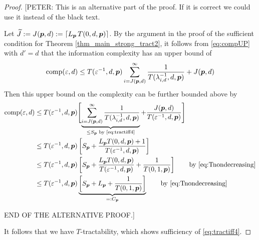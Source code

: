 \documentclass[11pt,a4paper]{article}
\newcommand{\peter}[1]{\begingroup\color{purple}#1\endgroup}
\begin{document}
\begin{proof}
\peter{
[PETER: This is an alternative part of the proof. If it is correct we could use it instead of the black text. 

\bigskip

Let $\widetilde{J}:=J(\boldsymbol{p},d): = \lceil L_{\boldsymbol{p}}\, T(0,d,\boldsymbol{p})\rceil$. By the argument in the proof of the sufficient condition for Theorem \ref{thm_main_strong_tract2}, it follows from \eqref{eq:compUP} with $d'=d$ that the information complexity has an upper bound of
\begin{equation*}
	 \operatorname{comp}(\varepsilon,d) \le  T(\varepsilon^{-1},d,\boldsymbol{p}) \sum_{i=J(\boldsymbol{p},d)}^\infty \frac{1}{T(\lambda_{i, d}^{-1},d,\boldsymbol{p})} + J(\boldsymbol{p},d)
\end{equation*}
 Then this upper bound on the complexity can be further bounded above by
\begin{align*}
       \operatorname{comp}(\varepsilon,d)
       & \le T(\varepsilon^{-1},d,\boldsymbol{p}) \Biggl [ 
       \underbrace{\sum_{i=J(\boldsymbol{p},d)}^\infty \frac{1}{T(\lambda_{i, d}^{-1},d,\boldsymbol{p})}}_{\le S_{\boldsymbol{p}} \text{ by \eqref{eq:tractiff4}}}
       + \frac{J(\boldsymbol{p},d)}{T(\varepsilon^{-1},d, \boldsymbol{p})} \Biggr ] \\
       & \le T(\varepsilon^{-1},d,\boldsymbol{p})\left[ S_{\boldsymbol{p}} + \frac{L_{\boldsymbol{p}} T(0,d,\boldsymbol{p})+1}{T(\varepsilon^{-1},d, \boldsymbol{p})}\right]\\
       & \le T(\varepsilon^{-1},d,\boldsymbol{p})\left[S_{\boldsymbol{p}} +\frac{L_{\boldsymbol{p}} T(0,d,\boldsymbol{p})}{T(\varepsilon^{-1},d, \boldsymbol{p})}
       + \frac{1}{T(0,1, \boldsymbol{p})}\right]
       \qquad \text{by \eqref{eq:Tnondecreasing}}   \\
       & \le T(\varepsilon^{-1},d,\boldsymbol{p}) 
       \underbrace{\left [  S_{\boldsymbol{p}} + L_{\boldsymbol{p}} + \frac{1}{T(0,1, \boldsymbol{p})}\right]}_{=:C_{\boldsymbol{p}}}
       \qquad \text{by \eqref{eq:Tnondecreasing}}  
\end{align*}


\bigskip

END OF THE ALTERNATIVE PROOF.]
}


It follows that we have $T$-tractability, which shows sufficiency of \eqref{eq:tractiff4}.

\bigskip


\end{proof}
\end{document}
